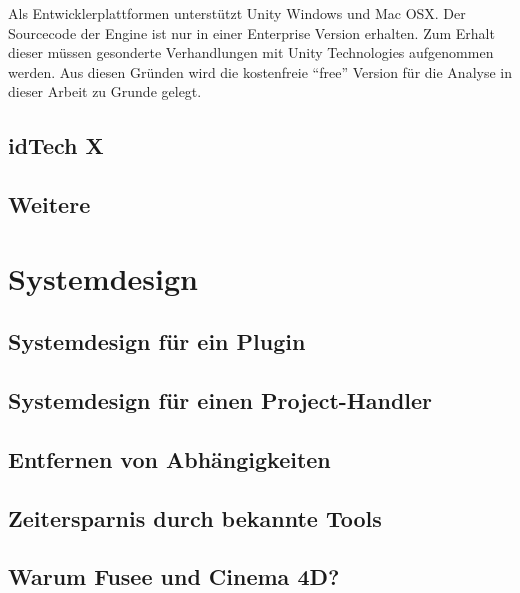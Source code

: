 \documentclass[pagesize, paper=a4, fontsize=12pt,titlepage=true, headings=small, headnosepline, abstractoff, liststotoc, nochapterprefix, plainheadsepline, twoside]{scrreprt}
\begin{document}
Als Entwicklerplattformen unterstützt Unity Windows und Mac OSX. Der Sourcecode der Engine ist nur in einer Enterprise Version erhalten. Zum Erhalt dieser müssen gesonderte Verhandlungen mit Unity Technologies aufgenommen werden. Aus diesen Gründen wird die kostenfreie “free” Version für die Analyse in dieser Arbeit zu Grunde gelegt.


\subsection{idTech X}
\subsection{Weitere}

\section{Systemdesign}
\subsection{Systemdesign für ein Plugin}
\subsection{Systemdesign für einen Project-Handler}
\subsection{Entfernen von Abhängigkeiten}
\subsection{Zeitersparnis durch bekannte Tools}
\subsection{Warum Fusee und Cinema 4D?}
\end{document}
